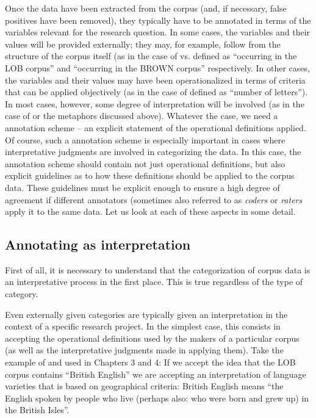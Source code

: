 Once the data have been extracted from the corpus (and, if necessary, false positives have been removed), they typically have to be annotated in terms of the variables relevant for the research question. In some cases, the variables and their values will be provided externally; they may, for example, follow from the structure of the corpus itself (as in the case of  vs.  defined as ``occurring in the LOB corpus'' and ``occurring in the BROWN corpus'' respectively. In other cases, the variables and their values may have been operationalized in terms of criteria that can be applied objectively (as in the case of  defined as ``number of letters''). In most cases, however, some degree of interpretation will be involved (as in the case of  or the metaphors discussed above). Whatever the case, we need a annotation scheme -- an explicit statement of the operational definitions applied. Of course, such a annotation scheme is especially important in cases where interpretative judgments are involved in categorizing the data. In this case, the annotation scheme should contain not just operational definitions, but also explicit guidelines as to how these definitions should be applied to the corpus data. These guidelines must be explicit enough to ensure a high degree of agreement if different annotators (sometimes also referred to as \emph{coders} or \emph{raters} apply it to the same data. Let us look at each of these aspects in some detail.

\subsection{Annotating as interpretation}
\label{sec:annotatingasinterpretation}

First of all, it is necessary to understand that the categorization of corpus data is an interpretative process in the first place. This is true regardless of the type of category.

Even externally given categories are typically given an interpretation in the context of a specific research project. In the simplest case, this consists in accepting the operational definitions used by the makers of a particular corpus (as well as the interpretative judgments made in applying them). Take the example of  and  used in Chapters 3 and 4: If we accept the idea that the LOB corpus contains ``British English'' we are accepting an interpretation of language varieties that is based on geographical criteria: British English means ``the English spoken by people who live (perhaps also: who were born and grew up) in the British Isles''.

